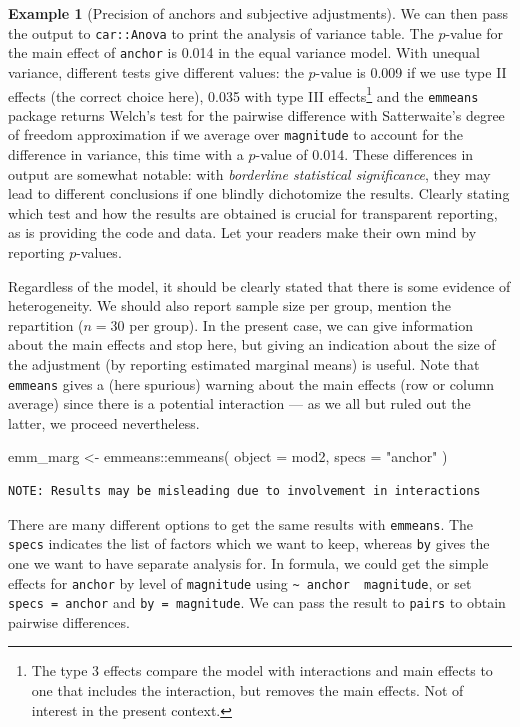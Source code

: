 \documentclass[
  11pt,
  letterpaper,
]{scrbook}
\newenvironment{Shaded}{\begin{snugshade}}{\end{snugshade}}
\newcommand{\AttributeTok}[1]{\textcolor[rgb]{0.40,0.45,0.13}{#1}}
\newcommand{\FunctionTok}[1]{\textcolor[rgb]{0.28,0.35,0.67}{#1}}
\newcommand{\NormalTok}[1]{\textcolor[rgb]{0.00,0.23,0.31}{#1}}
\newcommand{\OtherTok}[1]{\textcolor[rgb]{0.00,0.23,0.31}{#1}}
\newcommand{\SpecialCharTok}[1]{\textcolor[rgb]{0.37,0.37,0.37}{#1}}
\newcommand{\StringTok}[1]{\textcolor[rgb]{0.13,0.47,0.30}{#1}}
\theoremstyle{definition}
\theoremstyle{definition}
\newtheorem{example}{Example}[chapter]
\theoremstyle{remark}
\begin{document}
\begin{example}[Precision of anchors and subjective
adjustments]
We can then pass the output to \texttt{car::Anova} to print the analysis
of variance table. The \(p\)-value for the main effect of
\texttt{anchor} is 0.014 in the equal variance model. With unequal
variance, different tests give different values: the \(p\)-value is
0.009 if we use type II effects (the correct choice here), 0.035 with
type III effects\footnote{The type 3 effects compare the model with
  interactions and main effects to one that includes the interaction,
  but removes the main effects. Not of interest in the present context.}
and the \texttt{emmeans} package returns Welch's test for the pairwise
difference with Satterwaite's degree of freedom approximation if we
average over \texttt{magnitude} to account for the difference in
variance, this time with a \(p\)-value of 0.014. These differences in
output are somewhat notable: with \emph{borderline statistical
significance}, they may lead to different conclusions if one blindly
dichotomize the results. Clearly stating which test and how the results
are obtained is crucial for transparent reporting, as is providing the
code and data. Let your readers make their own mind by reporting
\(p\)-values.

Regardless of the model, it should be clearly stated that there is some
evidence of heterogeneity. We should also report sample size per group,
mention the repartition (\(n=30\) per group). In the present case, we
can give information about the main effects and stop here, but giving an
indication about the size of the adjustment (by reporting estimated
marginal means) is useful. Note that \texttt{emmeans} gives a (here
spurious) warning about the main effects (row or column average) since
there is a potential interaction --- as we all but ruled out the latter,
we proceed nevertheless.

\begin{Shaded}
\begin{Highlighting}[]
\NormalTok{emm\_marg }\OtherTok{\textless{}{-}}\NormalTok{ emmeans}\SpecialCharTok{::}\FunctionTok{emmeans}\NormalTok{(}
  \AttributeTok{object =}\NormalTok{ mod2,}
  \AttributeTok{specs =} \StringTok{"anchor"}
\NormalTok{)}
\end{Highlighting}
\end{Shaded}

\begin{verbatim}
NOTE: Results may be misleading due to involvement in interactions
\end{verbatim}

There are many different options to get the same results with
\texttt{emmeans}. The \texttt{specs} indicates the list of factors which
we want to keep, whereas \texttt{by} gives the one we want to have
separate analysis for. In formula, we could get the simple effects for
\texttt{anchor} by level of \texttt{magnitude} using
\texttt{\textasciitilde{}\ anchor\ \textbar{}\ magnitude}, or set
\texttt{specs\ =\ anchor} and \texttt{by\ =\ magnitude}. We can pass the
result to \texttt{pairs} to obtain pairwise differences.


\end{example}
\end{document}
